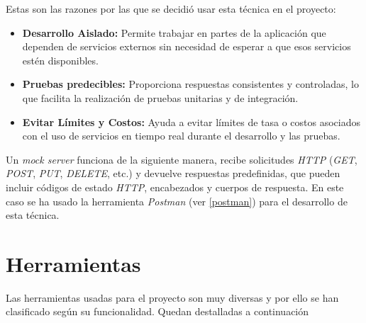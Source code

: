Estas son las razones por las que se decidió usar esta técnica en el proyecto:
\begin{itemize}
    \item \textbf{Desarrollo Aislado:} Permite trabajar en partes de la aplicación que dependen de servicios externos sin necesidad de esperar a que esos servicios estén disponibles.
    \item \textbf{Pruebas predecibles:} Proporciona respuestas consistentes y controladas, lo que facilita la realización de pruebas unitarias y de integración.
    \item \textbf{Evitar Límites y Costos:} Ayuda a evitar límites de tasa o costos asociados con el uso de servicios en tiempo real durante el desarrollo y las pruebas.
\end{itemize}

Un \textit{mock server} funciona de la siguiente manera, recibe solicitudes \textit{HTTP} (\textit{GET}, \textit{POST}, \textit{PUT}, \textit{DELETE}, etc.) y devuelve respuestas predefinidas, que pueden incluir códigos de estado \textit{HTTP}, encabezados y cuerpos de respuesta. En este caso se ha usado la herramienta \textit{Postman} (ver \ref{postman}) para el desarrollo de esta técnica.

\section{Herramientas}

Las herramientas usadas para el proyecto son muy diversas y por ello se han clasificado según su funcionalidad. Quedan destalladas a continuación

